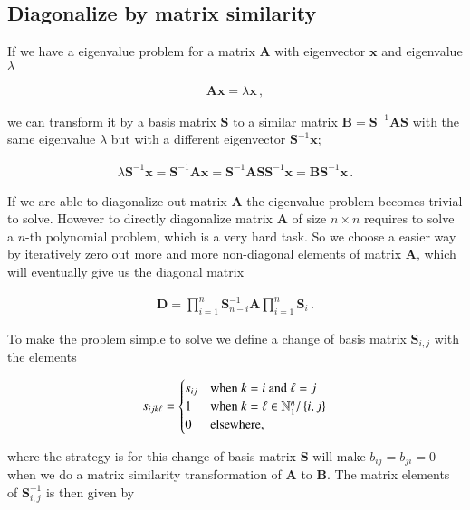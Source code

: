 \documentclass[11pt,english,a4paper]{article}
\begin{document}
\begin{flushleft}
\subsection{Diagonalize by matrix similarity}\label{sec_Diagonalize}

If we have a eigenvalue problem for a matrix $\textbf{A}$ with eigenvector $\mathbf{x}$ and eigenvalue $\lambda$

\begin{align*}
\mathbf{A}\mathbf{x} = \lambda \mathbf{x} \,,
\end{align*}

we can transform it by a basis matrix $\mathbf{S}$ to a similar matrix $\mathbf{B} = \mathbf{S}^{-1}\mathbf{A}\mathbf{S}$ with the same eigenvalue $\lambda$ but with a different eigenvector $\mathbf{S}^{-1} \mathbf{x}$;

\begin{align*}
\lambda \mathbf{S}^{-1} \mathbf{x} = \mathbf{S}^{-1}\mathbf{A}\mathbf{x} = \mathbf{S}^{-1}\mathbf{A}\mathbf{S} \mathbf{S}^{-1}\mathbf{x} = \mathbf{B}\mathbf{S}^{-1}\mathbf{x} \,.
\end{align*}

If we are able to diagonalize out matrix $\mathbf{A}$ the eigenvalue problem becomes trivial to solve. However to directly diagonalize matrix $\mathbf{A}$ of size $n\times n$ requires to solve a $n$-th polynomial problem, which is a very hard task. So we choose a easier way by iteratively zero out more and more non-diagonal elements of matrix $\mathbf{A}$, which will eventually give us the diagonal matrix

\begin{align*}
\mathbf{D} = \prod_{i=1}^n \mathbf{S}_{n-i}^{-1} \mathbf{A} \prod_{i=1}^n \mathbf{S}_i\,.
\end{align*}

To make the problem simple to solve we define a change of basis matrix $\textbf{S}_{i,j}$ with the elements

\begin{align}
s_{ijk\ell} = \begin{cases} s_{ij} & \text{when $k=i$ and $\ell=j$} \\ 1 & \text{when } k = \ell \in \mathbb{N}_1^n / \left\lbrace{i,j}\right\rbrace \\ 0 & \text{elsewhere,} \end{cases}  
\label{eq_8}
\end{align}

where the strategy is for this change of basis matrix $\mathbf{S}$ will make $b_{ij} = b_{ji} = 0$ when we do a matrix similarity transformation of $\mathbf{A}$ to $\mathbf{B}$. The matrix elements of $\mathbf{S}_{i,j}^{-1}$ is then given by


\end{flushleft}
\end{document}
